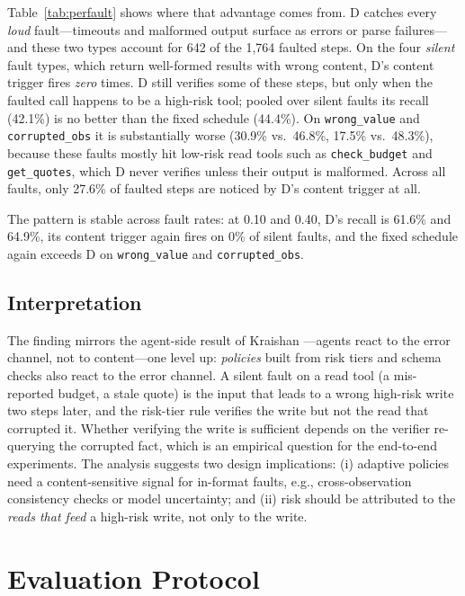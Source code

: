 \documentclass[conference]{IEEEtran}
\begin{document}
Table~\ref{tab:perfault} shows where that advantage comes from. D catches every
\emph{loud} fault---timeouts and malformed output surface as errors or parse failures---and
these two types account for 642 of the 1{,}764 faulted steps. On the four \emph{silent} fault
types, which return well-formed results with wrong content, D's content trigger fires
\emph{zero} times. D still verifies some of these steps, but only when the faulted call
happens to be a high-risk tool; pooled over silent faults its recall (42.1\%) is no better
than the fixed schedule (44.4\%). On \texttt{wrong\_value} and \texttt{corrupted\_obs} it is
substantially worse (30.9\% vs.\ 46.8\%, 17.5\% vs.\ 48.3\%), because these faults mostly hit
low-risk read tools such as \texttt{check\_budget} and \texttt{get\_quotes}, which D never
verifies unless their output is malformed. Across all faults, only 27.6\% of faulted steps are
noticed by D's content trigger at all.

The pattern is stable across fault rates: at 0.10 and 0.40, D's recall is 61.6\% and 64.9\%,
its content trigger again fires on 0\% of silent faults, and the fixed schedule again exceeds
D on \texttt{wrong\_value} and \texttt{corrupted\_obs}.

\subsection{Interpretation}
The finding mirrors the agent-side result of Kraishan \cite{kraishan2026loud}---agents react to
the error channel, not to content---one level up: \emph{policies} built from risk tiers and
schema checks also react to the error channel. A silent fault on a read tool (a mis-reported
budget, a stale quote) is the input that leads to a wrong high-risk write two steps later,
and the risk-tier rule verifies the write but not the read that corrupted it. Whether
verifying the write is sufficient depends on the verifier re-querying the corrupted fact,
which is an empirical question for the end-to-end experiments. The analysis suggests two
design implications: (i) adaptive policies need a content-sensitive signal for in-format
faults, e.g., cross-observation consistency checks or model uncertainty; and (ii) risk should
be attributed to the \emph{reads that feed} a high-risk write, not only to the write.

\section{Evaluation Protocol}
\label{sec:protocol}
\end{document}
